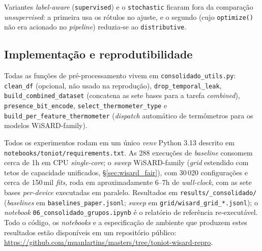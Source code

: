 Variantes \emph{label-aware} (\texttt{supervised}) e o
\texttt{stochastic} ficaram fora da comparação \emph{unsupervised}: a
primeira usa os rótulos no ajuste, e o segundo (cujo
\texttt{optimize()} não era acionado no \emph{pipeline}) reduzia-se
ao \texttt{distributive}.

\subsection{Implementação e reprodutibilidade}

Todas as funções de pré-processamento vivem em
\texttt{consolidado\_utils.py}:
\texttt{clean\_df} (opcional, não usado na reprodução),
\texttt{drop\_temporal\_leak},
\texttt{build\_combined\_dataset} (concatena as sete bases para a tarefa
\emph{combined}),
\texttt{presence\_bit\_encode},
\texttt{select\_thermometer\_type} e
\texttt{build\_per\_feature\_thermometer} (\emph{dispatch} automático
de termômetros para os modelos WiSARD-family).

Todos os experimentos rodam em um único \emph{venv} Python 3.13
descrito em \texttt{notebooks/toniot/requirements.txt}. As 288
execuções de \emph{baseline} consomem cerca de 1h em
CPU \emph{single-core}; o \emph{sweep} WiSARD-family (\emph{grid}
estendido com tetos de capacidade unificados, \S{}\ref{sec:wisard_fair}),
com 30\,020 configurações e cerca de 150\,mil \emph{fits}, roda em
aproximadamente 6--7h de \emph{wall-clock}, com as sete bases
\emph{per-device} executadas em paralelo. Resultados em
\texttt{results/\_consolidado/} (\emph{baselines} em
\texttt{baselines\_paper.jsonl}; \emph{sweep} em
\texttt{grid/wisard\_grid\_*.jsonl}); o \emph{notebook}
\texttt{06\_consolidado\_grupos.ipynb} é o relatório de referência
re-executável. Todo o código, os \emph{notebooks} e a especificação de
ambiente que produzem estes resultados estão disponíveis em um
repositório público: \url{https://github.com/muanlartins/masters/tree/toniot-wisard-repro}.
